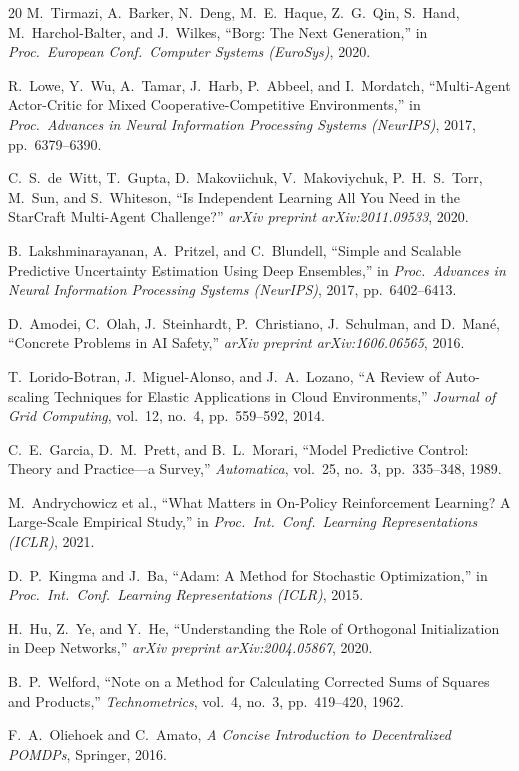 \documentclass[conference]{IEEEtran}
\begin{document}
\begin{thebibliography}{20}
M.~Tirmazi, A.~Barker, N.~Deng, M.~E.~Haque, Z.~G.~Qin, S.~Hand,
M.~Harchol-Balter, and J.~Wilkes,
``Borg: The Next Generation,''
in \textit{Proc.\ European Conf.\ Computer Systems (EuroSys)}, 2020.

R.~Lowe, Y.~Wu, A.~Tamar, J.~Harb, P.~Abbeel, and I.~Mordatch,
``Multi-Agent Actor-Critic for Mixed Cooperative-Competitive Environments,''
in \textit{Proc.\ Advances in Neural Information Processing Systems (NeurIPS)},
2017, pp.\ 6379--6390.

C.~S.~de~Witt, T.~Gupta, D.~Makoviichuk, V.~Makoviychuk, P.~H.~S.~Torr,
M.~Sun, and S.~Whiteson,
``Is Independent Learning All You Need in the StarCraft Multi-Agent Challenge?''
\textit{arXiv preprint arXiv:2011.09533}, 2020.

B.~Lakshminarayanan, A.~Pritzel, and C.~Blundell,
``Simple and Scalable Predictive Uncertainty Estimation Using Deep Ensembles,''
in \textit{Proc.\ Advances in Neural Information Processing Systems (NeurIPS)},
2017, pp.\ 6402--6413.

D.~Amodei, C.~Olah, J.~Steinhardt, P.~Christiano, J.~Schulman, and D.~Man\'{e},
``Concrete Problems in AI Safety,''
\textit{arXiv preprint arXiv:1606.06565}, 2016.

T.~Lorido-Botran, J.~Miguel-Alonso, and J.~A.~Lozano,
``A Review of Auto-scaling Techniques for Elastic Applications in Cloud Environments,''
\textit{Journal of Grid Computing}, vol.\ 12, no.\ 4, pp.\ 559--592, 2014.

C.~E.~Garcia, D.~M.~Prett, and B.~L.~Morari,
``Model Predictive Control: Theory and Practice---a Survey,''
\textit{Automatica}, vol.\ 25, no.\ 3, pp.\ 335--348, 1989.

M.~Andrychowicz et al.,
``What Matters in On-Policy Reinforcement Learning? A Large-Scale Empirical Study,''
in \textit{Proc.\ Int.\ Conf.\ Learning Representations (ICLR)}, 2021.

D.~P.~Kingma and J.~Ba,
``Adam: A Method for Stochastic Optimization,''
in \textit{Proc.\ Int.\ Conf.\ Learning Representations (ICLR)}, 2015.

H.~Hu, Z.~Ye, and Y.~He,
``Understanding the Role of Orthogonal Initialization in Deep Networks,''
\textit{arXiv preprint arXiv:2004.05867}, 2020.

B.~P.~Welford,
``Note on a Method for Calculating Corrected Sums of Squares and Products,''
\textit{Technometrics}, vol.\ 4, no.\ 3, pp.\ 419--420, 1962.

F.~A.~Oliehoek and C.~Amato,
\textit{A Concise Introduction to Decentralized POMDPs},
Springer, 2016.

\end{thebibliography}
\end{document}
